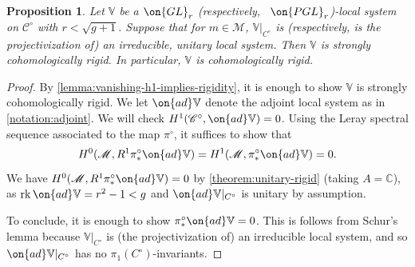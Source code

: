 \documentclass[12 pt]{amsart}
\theoremstyle{plain}
\newtheorem{proposition}[subsubsection]{Proposition}
\theoremstyle{definition}
\newtheorem{remark}[subsubsection]{Remark}
\theoremstyle{remark}
\numberwithin{equation}{section}
\DeclareMathOperator\rk{rk}
\begin{document}
\begin{proposition}
	\label{proposition:cohomologically-rigid}
	Let $\mathbb{V}$ be a $\on{GL}_r$ (respectively, ~$\on{PGL}_r$)-local system on
$\mathscr{C}^\circ$ with $r<\sqrt{g+1}$. Suppose that for $m\in \mathscr{M}$,
$\mathbb{V}|_{{C}^\circ}$ is (respectively, is the projectivization
of) an irreducible,
unitary local system. Then $\mathbb{V}$ is strongly cohomologically rigid. In
particular, $\mathbb V$ is cohomologically rigid.
\end{proposition}
\begin{proof}
	By \autoref{lemma:vanishing-h1-implies-rigidity}, it is enough to show
	$\mathbb V$ is strongly cohomologically rigid.
	We let $\on{ad}\mathbb V$ denote the adjoint local system as in
	\autoref{notation:adjoint}.
	We will check 
	$H^1(\mathscr C^\circ, \on{ad} \mathbb V) = 0$.
	Using the Leray spectral sequence associated to the map $\pi^\circ$, it suffices to show that  
	$$H^0(\mathscr M, R^1 \pi^\circ_* \on{ad} \mathbb V) = 
	H^1(\mathscr M, \pi^\circ_* \on{ad} \mathbb V) = 0.$$
	We have 
	$H^0(\mathscr M, R^1 \pi^\circ_* \on{ad} \mathbb V) = 0$
	by \autoref{theorem:unitary-rigid} (taking $A=\mathbb{C}$), as $\rk \on{ad}\mathbb{V}=r^2-1<g$ and $\on{ad}\mathbb{V}|_{{C}^\circ}$ is unitary by assumption.

	To conclude, it is enough to show $\pi^\circ_* \on{ad} \mathbb V = 0$.
	This is follows from Schur's lemma because
	$\mathbb{V}|_{{C}^\circ}$ is (the projectivization of) an
	irreducible local system, and so $\on{ad}\mathbb{V}|_{{C}^\circ}$ has no $\pi_1({C}^\circ)$-invariants.
\end{proof}
\end{document}
